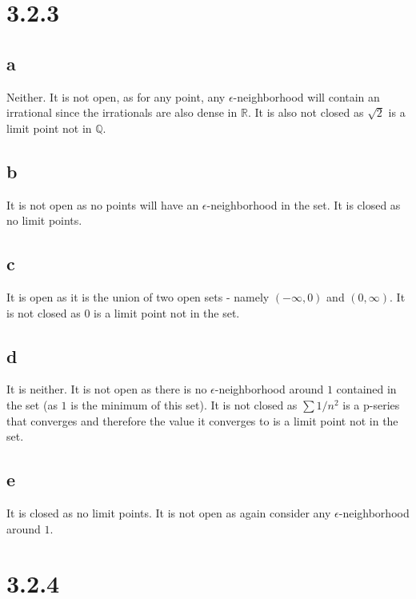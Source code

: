 \documentclass[10pt]{article}
\begin{document}
\section*{3.2.3}
\subsection*{a}
Neither. It is not open, as for any point, any $\epsilon$-neighborhood will contain an irrational since the irrationals are also dense in $\mathbb{R}.$ It is also not closed as $\sqrt{2}$ is a limit point not in $\mathbb{Q}.$

\subsection*{b}
It is not open as no points will have an $\epsilon$-neighborhood in the set. It is closed as no limit points.

\subsection*{c}
It is open as it is the union of two open sets - namely $(-\infty, 0)$ and $(0,\infty)$. It is not closed as $0$ is a limit point not in the set.

\subsection*{d}
It is neither. It is not open as there is no $\epsilon$-neighborhood around $1$ contained in the set (as $1$ is the minimum of this set). It is not closed as $\sum 1/n^2$ is a p-series that converges and therefore the value it converges to is a limit point not in the set.

\subsection*{e}

It is closed as no limit points. It is not open as again consider any $\epsilon$-neighborhood around $1$.

\section*{3.2.4}
\end{document}
